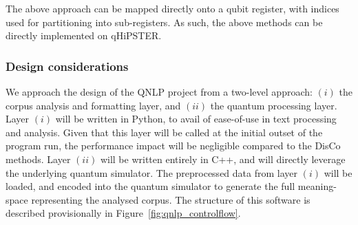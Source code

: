The above approach can be mapped directly onto a qubit register, with indices used for partitioning into sub-registers. As such, the above methods can be directly implemented on qHiPSTER.


\fi

\subsubsection{Design considerations}
\label{sec:design_considerations}

We approach the design of the QNLP project from a two-level approach: $(i)$ the corpus analysis and formatting layer, and $(ii)$ the quantum processing layer. Layer $(i)$ will be written in Python, to avail of ease-of-use in text processing and analysis. Given that this layer will be called at the initial outset of the program run, the performance impact will be negligible compared to the DisCo methods. Layer $(ii)$ will be written entirely in C++, and will directly leverage the underlying quantum simulator. The preprocessed data from layer $(i)$ will be loaded, and encoded into the quantum simulator to generate the full meaning-space representing the analysed corpus. The structure of this software is described provisionally in Figure~\ref{fig:qnlp_controlflow}.


